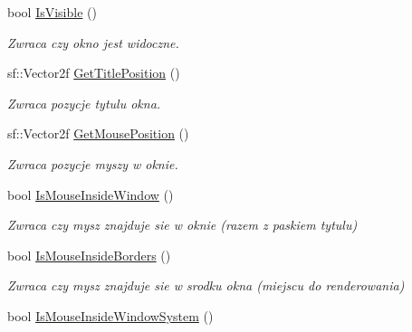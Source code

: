 \begin{DoxyCompactItemize}
bool \mbox{\hyperlink{classtfp_1_1_window_a5fbb2bf6b122a35ff783db394864d907}{Is\+Visible}} ()
\begin{DoxyCompactList}\small\item\em Zwraca czy okno jest widoczne. \end{DoxyCompactList}\item 
\mbox{\label{classtfp_1_1_window_a0906752d955b606443a1c5cc4a1118d3}} 
sf\+::\+Vector2f \mbox{\hyperlink{classtfp_1_1_window_a0906752d955b606443a1c5cc4a1118d3}{Get\+Title\+Position}} ()
\begin{DoxyCompactList}\small\item\em Zwraca pozycje tytulu okna. \end{DoxyCompactList}\item 
\mbox{\label{classtfp_1_1_window_a9ff075886e6e148ab2417072823a0adb}} 
sf\+::\+Vector2f \mbox{\hyperlink{classtfp_1_1_window_a9ff075886e6e148ab2417072823a0adb}{Get\+Mouse\+Position}} ()
\begin{DoxyCompactList}\small\item\em Zwraca pozycje myszy w oknie. \end{DoxyCompactList}\item 
\mbox{\label{classtfp_1_1_window_a765685145b440d7b147eb41ac18e71af}} 
bool \mbox{\hyperlink{classtfp_1_1_window_a765685145b440d7b147eb41ac18e71af}{Is\+Mouse\+Inside\+Window}} ()
\begin{DoxyCompactList}\small\item\em Zwraca czy mysz znajduje sie w oknie (razem z paskiem tytulu) \end{DoxyCompactList}\item 
\mbox{\label{classtfp_1_1_window_a8a682d78e2440fcd41b2f35195218582}} 
bool \mbox{\hyperlink{classtfp_1_1_window_a8a682d78e2440fcd41b2f35195218582}{Is\+Mouse\+Inside\+Borders}} ()
\begin{DoxyCompactList}\small\item\em Zwraca czy mysz znajduje sie w srodku okna (miejscu do renderowania) \end{DoxyCompactList}\item 
\mbox{\label{classtfp_1_1_window_ae914bd6e2b89f7577e1d67a36b515029}} 
bool \mbox{\hyperlink{classtfp_1_1_window_ae914bd6e2b89f7577e1d67a36b515029}{Is\+Mouse\+Inside\+Window\+System}} ()

\end{DoxyCompactItemize}
